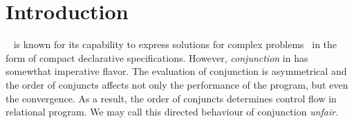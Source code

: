 \section{Introduction}


\mk~\cite{fair:TheReasonedSchemer,fair:micro} is known for its capability to express solutions for complex problems~\cite{fair:quines,fair:teorem-prover,fair:seven}
in the form of compact declarative specifications. However, \emph{conjunction} in \mk has somewthat imperative flavor. The evaluation of conjunction is asymmetrical
and the order of conjuncts affects not only the performance of the program, but even the convergence. As a result, the order of conjuncts determines control flow in
relational program. We may call this directed behaviour of conjunction \textit{unfair}.

